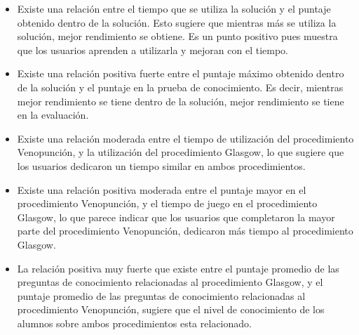 \begin{itemize}

\item Existe una relación entre el tiempo que se utiliza la solución y el
    puntaje obtenido dentro de la solución. Esto sugiere que mientras más se
    utiliza la solución, mejor rendimiento se obtiene. Es un punto positivo pues
    muestra que los usuarios aprenden a utilizarla y mejoran con el tiempo.

\item Existe una relación positiva fuerte entre el puntaje máximo
    obtenido dentro de la solución y el puntaje en la prueba de conocimiento. Es
    decir, mientras mejor rendimiento se tiene dentro de la solución, mejor
    rendimiento se tiene en la evaluación.

\item Existe una relación moderada entre el tiempo de utilización del
    procedimiento Venopunción, y la utilización del procedimiento Glasgow, lo
    que sugiere que los usuarios dedicaron un tiempo similar en ambos
    procedimientos.

\item Existe una relación positiva moderada entre el puntaje mayor en el
    procedimiento Venopunción, y el tiempo de juego en el procedimiento Glasgow,
    lo que parece indicar que los usuarios que completaron la mayor parte del
    procedimiento Venopunción, dedicaron más tiempo al procedimiento Glasgow. 

\item La relación positiva muy fuerte que existe entre el puntaje promedio de
    las preguntas de conocimiento relacionadas al procedimiento Glasgow, y el
    puntaje promedio de las preguntas de conocimiento relacionadas al
    procedimiento Venopunción, sugiere que el nivel de conocimiento de los
    alumnos sobre ambos procedimientos esta relacionado.

\end{itemize}
